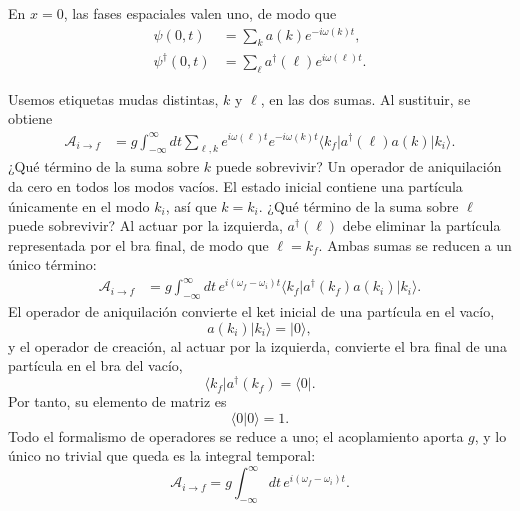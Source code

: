 En \(x=0\), las fases espaciales valen uno, de modo que
\begin{align}
\psi(0,t)&=\sum_k a(k)e^{-i\omega(k)t},\\
\psi^\dagger(0,t)&=\sum_\ell a^\dagger(\ell)e^{i\omega(\ell)t}.
\end{align}

\begin{classroomqa}\end{classroomqa}

Usemos etiquetas mudas distintas, \(k\) y \(\ell\), en las dos sumas. Al sustituir, se obtiene
\begin{align}
\mathcal A_{i\to f}
&=g\int_{-\infty}^{\infty}dt
\sum_{\ell,k}
e^{i\omega(\ell)t}e^{-i\omega(k)t}
\langle k_f\rvert a^\dagger(\ell)a(k)\lvert k_i\rangle.
\end{align}
¿Qué término de la suma sobre \(k\) puede sobrevivir? Un operador de aniquilación da cero en todos los modos vacíos. El estado inicial contiene una partícula únicamente en el modo \(k_i\), así que \(k=k_i\). ¿Qué término de la suma sobre \(\ell\) puede sobrevivir? Al actuar por la izquierda, \(a^\dagger(\ell)\) debe eliminar la partícula representada por el bra final, de modo que \(\ell=k_f\). Ambas sumas se reducen a un único término:
\begin{align}
\mathcal A_{i\to f}
&=g\int_{-\infty}^{\infty}dt\,
e^{i(\omega_f-\omega_i)t}
\langle k_f\rvert a^\dagger(k_f)a(k_i)\lvert k_i\rangle.
\end{align}
El operador de aniquilación convierte el ket inicial de una partícula en el vacío,
\begin{equation}
a(k_i)\lvert k_i\rangle=\lvert0\rangle,
\end{equation}
y el operador de creación, al actuar por la izquierda, convierte el bra final de una partícula en el bra del vacío,
\begin{equation}
\langle k_f\rvert a^\dagger(k_f)=\langle0\rvert.
\end{equation}
Por tanto, su elemento de matriz es
\begin{equation}
\langle0\vert0\rangle=1.
\end{equation}
Todo el formalismo de operadores se reduce a uno; el acoplamiento aporta \(g\), y lo único no trivial que queda es la integral temporal:
\begin{equation}
\mathcal A_{i\to f}
=g\int_{-\infty}^{\infty}dt\,
e^{i(\omega_f-\omega_i)t}.
\end{equation}

